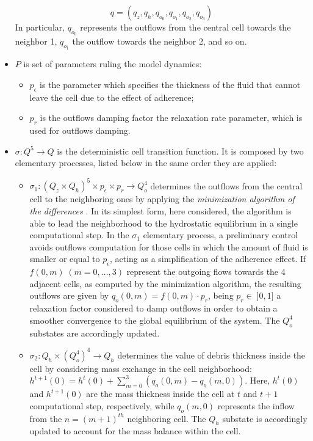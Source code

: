 \begin{itemize}
	$$ q = (q_z, q_h, q_{o_0}, q_{o_1}, q_{o_2}, q_{o_3})$$ In
	particular, $q_{o_0}$ represents the outflows from the central
	cell towards the neighbor 1, $q_{o_1}$ the outflow towards the
	neighbor 2, and so on.
	
	\item $P$ is set of parameters ruling the model dynamics:
	
	\begin{itemize}
		\item $p_\epsilon$ is the parameter which specifies the thickness
		of the fluid that cannot leave the cell due to the effect of
		adherence;
		\item $p_r$ is the outflows damping factor the relaxation rate
		parameter, which is used for outflows damping.
	\end{itemize}
	
	\item $\sigma : Q^5 \rightarrow Q$ is the deterministic cell
	transition function. It is composed by two elementary processes,
	listed below in the same order they are applied:
	\begin{itemize}
		\item $\sigma_1 : (Q_z \times Q_h)^5 \times p_\epsilon \times
		p_r\rightarrow Q_o^4$ determines the outflows from the central
		cell to the neighboring ones by applying the \emph{minimization
			algorithm of the differences} \cite{DiGregorio&Serra-1999}. In
		its simplest form, here considered, the algorithm is able to
		lead the neighborhood to the hydrostatic equilibrium in a single
		computational step. In the $\sigma_1$ elementary process, a
		preliminary control avoids outflows computation for those cells
		in which the amount of fluid is smaller or equal to
		$p_\epsilon$, acting as a simplification of the adherence
		effect. If $f(0,m) \; (m=0, \ldots, 3)$ represent the outgoing
		flows towards the 4 adjacent cells, as computed by the
		minimization algorithm, the resulting outflows are given by
		$q_o(0,m)=f(0,m) \cdot p_r$, being $p_r \in \; ]0,1]$ a
		relaxation factor considered to damp outflows in order to
		obtain a smoother convergence to the global equilibrium of
		the system. The $Q_o^4$ substates are accordingly updated.
		
		\item $\sigma_2: Q_h \times (Q_o^4)^4 \rightarrow Q_h$
		determines the value of debris thickness inside the cell by
		considering mass exchange in the cell neighborhood:
		$h^{t+1}(0) = h^t(0) + \sum_{m=0}^3 (q_o(0,m) -
		q_o(m,0))$. Here, $h^{t}(0)$ and $h^{t+1}(0)$ are the mass
		thickness inside the cell at $t$ and $t+1$ computational
		step, respectively, while $q_o(m,0)$ represents the inflow
		from the $n=(m+1)^{th}$ neighboring cell. The $Q_h$ substate
		is accordingly updated to account for the mass balance
		within the cell.
	\end{itemize}
\end{itemize}


